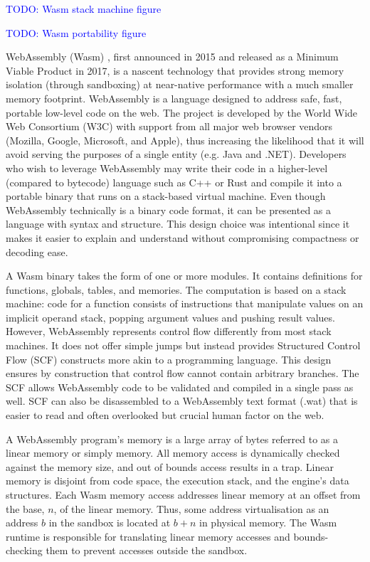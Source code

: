 \textcolor{blue}{TODO: Wasm stack machine figure}

\textcolor{blue}{TODO: Wasm portability figure}

WebAssembly (Wasm) \cite{wasm}, first announced in 2015 and released as a Minimum Viable Product in 2017, is a nascent technology that provides strong memory isolation (through sandboxing) at near-native performance with a much smaller memory footprint. WebAssembly is a language designed to address safe, fast, portable low-level code on the web. The project is developed by the World Wide Web Consortium (W3C) with support from all major web browser vendors (Mozilla, Google, Microsoft, and Apple), thus increasing the likelihood that it will avoid serving the purposes of a single entity (e.g. Java and .NET). Developers who wish to leverage WebAssembly may write their code in a higher-level (compared to bytecode) language such as C++ or Rust and compile it into a portable binary that runs on a stack-based virtual machine. Even though WebAssembly technically is a binary code format, it can be presented as a language with syntax and structure. This design choice was intentional since it makes it easier to explain and understand without compromising compactness or decoding ease.

A Wasm binary takes the form of one or more modules. It contains definitions for functions, globals, tables, and memories. The computation is based on a stack machine: code for a function consists of instructions that manipulate values on an implicit operand stack, popping argument values and pushing result values. However, WebAssembly represents control flow differently from most stack machines. It does not offer simple jumps but instead provides Structured Control Flow (SCF) constructs more akin to a programming language. This design ensures by construction that control flow cannot contain arbitrary branches. The SCF allows WebAssembly code to be validated and compiled in a single pass as well. SCF can also be disassembled to a WebAssembly text format (.wat) that is easier to read and often overlooked but crucial human factor on the web.

A WebAssembly program's memory is a large array of bytes referred to as a linear memory or simply memory. All memory access is dynamically checked against the memory size, and out of bounds access results in a trap. Linear memory is disjoint from code space, the execution stack, and the engine's data structures. Each Wasm memory access addresses linear memory at an offset from the base, $n$, of the linear memory. Thus, some address virtualisation as an address $b$ in the sandbox is located at $b + n$ in physical memory. The Wasm runtime is responsible for translating linear memory accesses and bounds-checking them to prevent accesses outside the sandbox.

